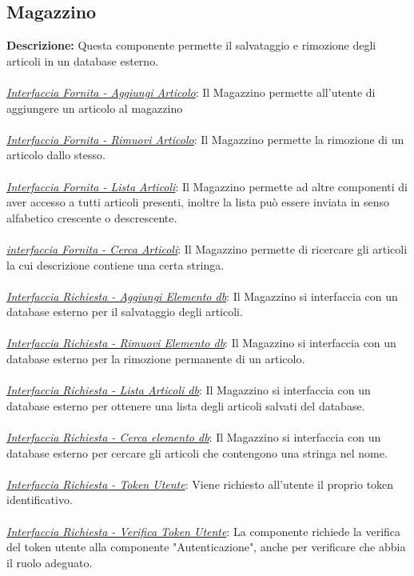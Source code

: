 \documentclass{report}
\begin{document}
\subsection*{Magazzino}
\textbf{Descrizione: } Questa componente permette il salvataggio e rimozione degli articoli in un database esterno.\\ \\
\uline{\textit{Interfaccia Fornita - Aggiungi Articolo}}:
Il Magazzino permette all'utente di aggiungere un articolo al magazzino  \\ \\%
\uline{\textit{Interfaccia Fornita - Rimuovi Articolo}}:
Il Magazzino permette la rimozione di un articolo dallo stesso.\\ \\
\uline{\textit{Interfaccia Fornita - Lista Articoli}}:
Il Magazzino permette ad altre componenti di aver accesso a tutti articoli presenti, inoltre la lista può essere inviata in senso alfabetico crescente o descrescente.\\ \\
\uline{\textit{interfaccia Fornita - Cerca Articoli}}:
Il Magazzino permette di ricercare gli articoli la cui descrizione contiene una certa stringa.\\ \\
\uline{\textit{Interfaccia Richiesta - Aggiungi Elemento db}}:
Il Magazzino si interfaccia con un database esterno per il salvataggio degli articoli.\\ \\
\uline{\textit{Interfaccia Richiesta - Rimuovi Elemento db}}:
Il Magazzino si interfaccia con un database esterno per la rimozione permanente di un articolo.\\ \\
\uline{\textit{Interfaccia Richiesta - Lista Articoli db}}:
Il Magazzino si interfaccia con un database esterno per ottenere una lista degli articoli salvati del database.\\ \\
\uline{\textit{Interfaccia Richiesta - Cerca elemento db}}:
Il Magazzino si interfaccia con un database esterno per cercare gli articoli che contengono una stringa nel nome.\\ \\
\uline{\textit{Interfaccia Richiesta - Token Utente}}:
Viene richiesto all'utente il proprio token identificativo.\\ \\
\uline{\textit{Interfaccia Richiesta - Verifica Token Utente}}: 
La componente richiede la verifica del token utente alla componente "Autenticazione", anche per verificare che abbia il ruolo adeguato.\\
\end{document}
